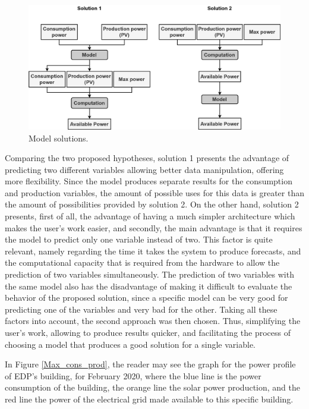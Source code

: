 \begin{figure}[h!]
    \centering
    \begin{center}
    \includegraphics[width=1\textwidth]{Images/Available.png}
    \caption{Model solutions.}
    \label{avsol}
    \end{center}
\end{figure}

Comparing the two proposed hypotheses, solution 1 presents the advantage of predicting two different variables allowing better data manipulation, offering more flexibility. Since the model produces separate results for the consumption and production variables, the amount of possible uses for this data is greater than the amount of possibilities provided by solution 2. On the other hand, solution 2 presents, first of all, the advantage of having a much simpler architecture which makes the user's work easier, and secondly, the main advantage is that it requires the model to predict only one variable instead of two. This factor is quite relevant, namely regarding the time it takes the system to produce forecasts, and the computational capacity that is required from the hardware to allow the prediction of two variables simultaneously. The prediction of two variables with the same model also has the disadvantage of making it difficult to evaluate the behavior of the proposed solution, since a specific model can be very good for predicting one of the variables and very bad for the other. 
Taking all these factors into account, the second approach was then chosen. Thus, simplifying the user’s work, allowing to produce results quicker, and facilitating the process of choosing a model that produces a good solution for a single variable.


In Figure \ref{Max_cons_prod}, the reader may see the graph for the power profile of \ac{EDP}’s building, for February 2020, where the blue line is the power consumption of the building, the orange line the solar power production, and the red line the power of the electrical grid made available to this specific building.



